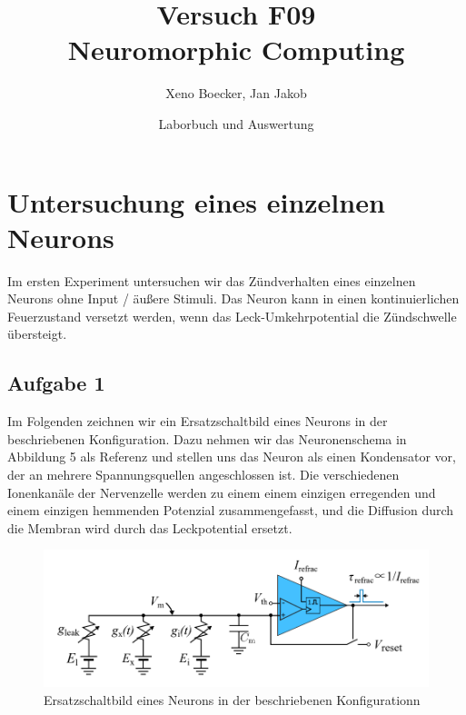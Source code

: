 \documentclass[10pt,a4paper]{scrartcl}
\title{Versuch F09\\ Neuromorphic Computing}
\date{Laborbuch und Auswertung}
\author{Xeno Boecker, Jan Jakob}
\begin{document}

\thispagestyle{empty}  %
 \maketitle

\newpage
\tableofcontents



\newpage



\section{Untersuchung eines einzelnen Neurons}

Im ersten Experiment untersuchen wir das Zündverhalten eines einzelnen Neurons ohne Input / äußere Stimuli. Das Neuron kann in einen kontinuierlichen Feuerzustand versetzt werden, wenn das Leck-Umkehrpotential die Zündschwelle übersteigt.

\subsection{Aufgabe 1}
Im Folgenden zeichnen wir ein Ersatzschaltbild eines Neurons in der beschriebenen Konfiguration. Dazu nehmen wir das Neuronenschema in Abbildung 5 als Referenz und stellen uns das Neuron als einen Kondensator vor, der an mehrere Spannungsquellen angeschlossen ist. Die verschiedenen Ionenkanäle der Nervenzelle werden zu einem
einem einzigen erregenden und einem einzigen hemmenden Potenzial zusammengefasst, und die Diffusion durch die Membran wird durch das Leckpotential ersetzt.

\begin{figure} [ht]
\begin{center}
\includegraphics[scale=0.5]{pictures/Neuron_Circuit.png}
\caption{Ersatzschaltbild eines Neurons in der beschriebenen Konfigurationn}
\label{fig:schaltung1}
\end{center}
\end{figure}
\end{document}
